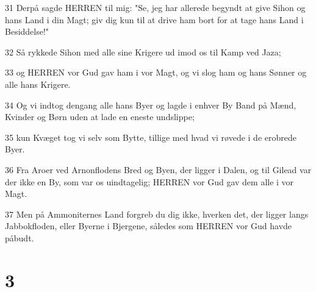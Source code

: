 \par 31 Derpå sagde HERREN til mig: "Se, jeg har allerede begyndt at give Sihon og hans Land i din Magt; giv dig kun til at drive ham bort for at tage hans Land i Besiddelse!"
\par 32 Så rykkede Sihon med alle sine Krigere ud imod os til Kamp ved Jaza;
\par 33 og HERREN vor Gud gav ham i vor Magt, og vi slog ham og hans Sønner og alle hans Krigere.
\par 34 Og vi indtog dengang alle hans Byer og lagde i enhver By Band på Mænd, Kvinder og Børn uden at lade en eneste undslippe;
\par 35 kun Kvæget tog vi selv som Bytte, tillige med hvad vi røvede i de erobrede Byer.
\par 36 Fra Aroer ved Arnonflodens Bred og Byen, der ligger i Dalen, og til Gilead var der ikke en By, som var os uindtagelig; HERREN vor Gud gav dem alle i vor Magt.
\par 37 Men på Ammoniternes Land forgreb du dig ikke, hverken det, der ligger langs Jabbokfloden, eller Byerne i Bjergene, således som HERREN vor Gud havde påbudt.

\chapter{3}

